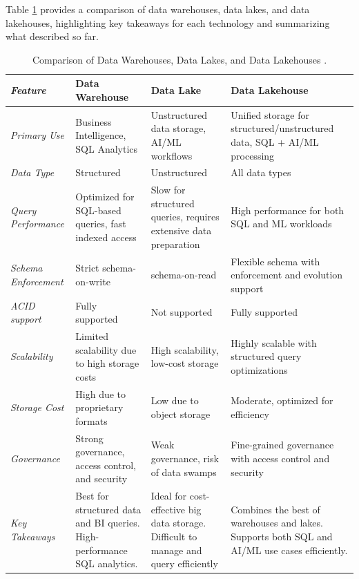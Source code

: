 Table \ref{tab:DBMS_comparison} provides a comparison of data warehouses, data lakes, and data lakehouses, highlighting key takeaways for each technology and summarizing what described so far.

\begin{table}[h!]
    \centering
    \caption[Comparison of Data Technologies]{Comparison of Data Warehouses, Data Lakes, and Data Lakehouses \cite{inmonFiveStepsSuccessful}.}
    \label{tab:DBMS_comparison}
    \begin{tabular}{|p{2.3cm}|p{3.1cm}|p{3.1cm}|p{3.1cm}|}
        \hline
        \textit{\textbf{Feature}} & \textbf{Data Warehouse} & \textbf{Data Lake} & \textbf{Data Lakehouse} \\
        \hline
        \textit{Primary Use} & Business Intelligence, SQL Analytics & Unstructured data storage, AI/ML workflows & Unified storage for structured/unstructured data, SQL + AI/ML processing \\
        \hline
        \textit{Data Type} & Structured & Unstructured & All data types \\
        \hline
        \textit{Query Performance} & Optimized for SQL-based queries, fast indexed access & Slow for structured queries, requires extensive data preparation & High performance for both SQL and ML workloads \\
        \hline
        \textit{Schema Enforcement} & Strict schema-on-write & schema-on-read & Flexible schema with enforcement and evolution support \\
        \hline
        \textit{\gls{ACID} support} & Fully supported & Not supported & Fully supported \\
        \hline
        \textit{Scalability} & Limited scalability due to high storage costs & High scalability, low-cost storage & Highly scalable with structured query optimizations \\
        \hline
        \textit{Storage Cost} & High due to proprietary formats & Low due to object storage & Moderate, optimized for efficiency \\
        \hline
        \textit{Governance} & Strong governance, access control, and security & Weak governance, risk of data swamps & Fine-grained governance with access control and security \\
        \hline
        \textit{Key Takeaways} & Best for structured data and BI queries. High-performance SQL analytics. & Ideal for cost-effective big data storage. Difficult to manage and query efficiently & Combines the best of warehouses and lakes. Supports both SQL and AI/ML use cases efficiently. \\
        \hline
    \end{tabular}
\end{table}




